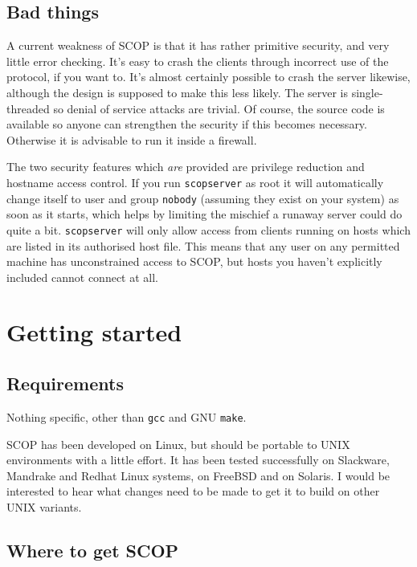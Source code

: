 \documentclass[12pt,a4paper,twoside]{article}
\renewcommand{\_}{\texttt{\symbol{95}}}
\begin{document}
\subsection{Bad things}

A current weakness of SCOP is that it has rather primitive security, and
very little error checking. It's easy to crash the clients through
incorrect use of the protocol, if you want to. It's almost certainly
possible to crash the server likewise, although the design is supposed
to make this less likely. The server is single-threaded so denial of
service attacks are trivial. Of course, the source code is available so
anyone can strengthen the security if this becomes necessary. Otherwise
it is advisable to run it inside a firewall.

The two security features which \textit{are} provided are privilege
reduction and hostname access control. If you run \texttt{scopserver}
as root it will automatically change itself to user and group
\texttt{nobody} (assuming they exist on your system) as soon as it
starts, which helps by limiting the mischief a runaway server could do
quite a bit. \texttt{scopserver} will only allow access from clients
running on hosts which are listed in its authorised host file. This
means that any user on any permitted machine has unconstrained access
to SCOP, but hosts you haven't explicitly included cannot connect at
all.

\section{Getting started}
\label{installation}

\subsection{Requirements}

Nothing specific, other than \texttt{gcc} and GNU \texttt{make}.

SCOP has been developed on Linux, but should be portable to UNIX
environments with a little effort. It has been tested successfully on
Slackware, Mandrake and Redhat Linux systems, on FreeBSD and on Solaris.
I would be interested to hear what changes need to be made to get it to
build on other UNIX variants.

\subsection{Where to get SCOP}
\end{document}

